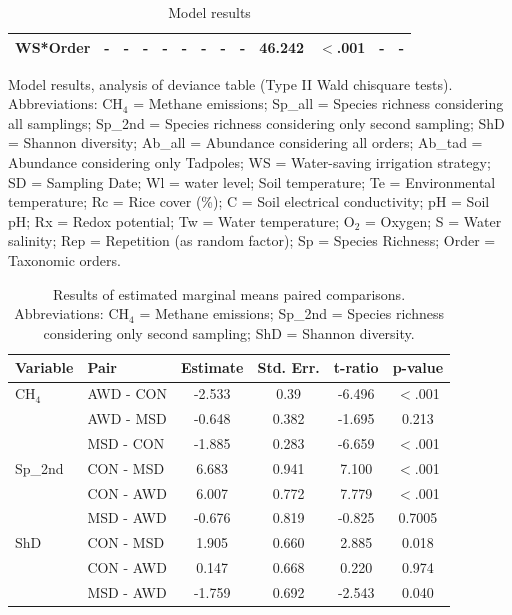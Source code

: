 \begin{table}
\begin{tabular}{l cc cc cc cc cc cc}
    WS*Order & - & - & - & - & - & - & - & - & 46.242 & $<$.001 & - & - \\
    \bottomrule
\end{tabular}
    \caption{Model results}{Model results, analysis of deviance table (Type II Wald chisquare tests). Abbreviations: CH$_{4}$ = Methane emissions; Sp\_all = Species richness considering all samplings; Sp\_2nd = Species richness considering only second sampling; ShD = Shannon diversity; Ab\_all = Abundance considering all orders; Ab\_tad = Abundance considering only Tadpoles; WS = Water-saving irrigation strategy; SD = Sampling Date; Wl = water level; Soil temperature; Te = Environmental temperature; Rc = Rice cover (\%); C = Soil electrical conductivity; pH = Soil pH; Rx = Redox potential; Tw = Water temperature; O$_{2}$ = Oxygen; S = Water salinity; Rep = Repetition (as random factor); Sp = Species Richness;  Order = Taxonomic orders.}
    \label{mod_res}
\end{table}


\begin{table}[htbp]
\scriptsize %
    \centering
    \begin{tabular}{llcccc}
        \toprule
        Variable & Pair & Estimate & Std. Err. & t-ratio & p-value \\
        \midrule
        CH$_{4}$ & AWD - CON  & -2.533  & 0.39  & -6.496  & $<$.001 \\
         & AWD - MSD  & -0.648  & 0.382 & -1.695  & 0.213 \\
         & MSD - CON  & -1.885  & 0.283 & -6.659  & $<$.001 \\
        \midrule
        Sp\_2nd & CON - MSD  & 6.683   & 0.941 & 7.100   & $<$.001 \\
         & CON - AWD  & 6.007   & 0.772 & 7.779   & $<$.001 \\
         & MSD - AWD  & -0.676  & 0.819 & -0.825  & 0.7005 \\
        \midrule
        ShD & CON - MSD  & 1.905   & 0.660 & 2.885   & 0.018 \\
         & CON - AWD  & 0.147   & 0.668 & 0.220   & 0.974 \\
         & MSD - AWD  & -1.759  & 0.692 & -2.543  & 0.040 \\
        \bottomrule
    \end{tabular}
        \caption[Estimated marginal means]{Results of estimated marginal means paired comparisons. Abbreviations: CH$_{4}$ = Methane emissions; Sp\_2nd = Species richness considering only second sampling; ShD = Shannon diversity.}
            \label{mod_pairs}
\end{table}

